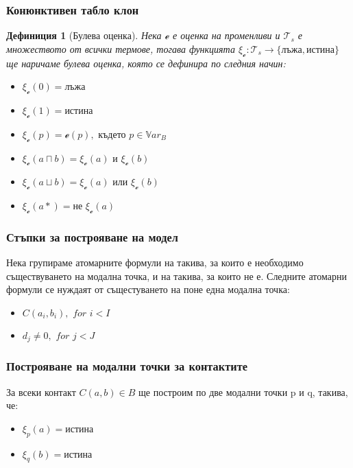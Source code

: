 \documentclass{beamer}
\newtheorem{defn}{Дефиниция}[section]
\newcommand{\curvedE}{\mathscr{e}}
\newcommand{\Var}{\mathbb{V}ar}
\newcommand{\vBool}{\xi}
\newcommand{\Ts}{\mathcal{T}_s}
\begin{document}
\begin{frame}\frametitle{Конюнктивен табло клон}
\begin{defn}[Булева оценка]
		Нека $\curvedE$ е оценка на променливи и $\Ts$ е множеството от всички термове, тогава 
		функцията $\vBool_{\curvedE} : \Ts \rightarrow \{ \textbf{лъжа}, \textbf{истина}\}$ ще наричаме булева оценка, която се дефинира по следния начин:
		\begin{itemize}
			\item $\vBool_{\curvedE}(0) = \textbf{лъжа}$
			\item $\vBool_{\curvedE}(1) = \textbf{истина}$
			\item $\vBool_{\curvedE}(p) = \curvedE(p), \textit{ където } p \in \Var_B$
			\item $\vBool_{\curvedE}(a \sqcap b) = \vBool_{\curvedE}(a) \textit{ и } \vBool_{\curvedE}(b)$
			\item $\vBool_{\curvedE}(a \sqcup b) = \vBool_{\curvedE}(a) \textit{ или } \vBool_{\curvedE}(b)$
			\item $\vBool_{\curvedE}(a*) = \textit{не } \vBool_{\curvedE}(a)$
		\end{itemize}
\end{defn}
\end{frame}

\begin{frame}\frametitle{Стъпки за построяване на модел}
	Нека групираме атомарните формули на такива, за които е необходимо съществуването на модална точка, и на такива, за които не е.
\newline
	Следните атомарни формули се нуждаят от същестуването на поне една модална точка:
		\begin{itemize}
			\item $C(a_i, b_i), \textit{ for } i < I$
			\item $d_j \neq 0, \textit{ for } j < J$
		\end{itemize}
\end{frame}

\begin{frame}\frametitle{Построяване на модални точки за контактите}
	За всеки контакт $C(a, b) \in B$ ще построим по две модални точки p и q, такива, че:
		\begin{itemize}
			\item $\vBool_{p}(a) = \textbf{истина}$
			\item $\vBool_{q}(b) = \textbf{истина}$
		\end{itemize}
\end{frame}
\end{document}
